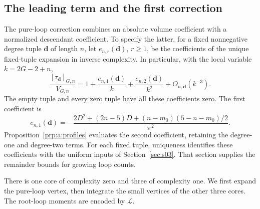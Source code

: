 \subsection{The leading term and the first correction}
\label{subsec:s04:02}

The pure-loop correction combines an absolute volume coefficient with
a normalized descendant coefficient. To specify the latter, for a
fixed nonnegative degree tuple $\mathbf d$ of length $n$, let
$e_{n,r}(\mathbf d)$, $r\geq1$, be the coefficients of the unique
fixed-tuple expansion in inverse complexity. In particular, with the
local variable $k=2G-2+n$,
\begin{equation}\label{eq:s04:profile-coefficients}
 \frac{[\tau_{\mathbf d}]_{G,n}}{V_{G,n}}
 =1+\frac{e_{n,1}(\mathbf d)}k
     +\frac{e_{n,2}(\mathbf d)}{k^2}+O_{n,\mathbf d}(k^{-3}).
\end{equation}
The empty tuple and every zero tuple have all these coefficients zero.
The first coefficient is
\begin{equation}\label{eq:s04:first-profile}
 e_{n,1}(\mathbf d)
 =-\frac{2D^2+(2n-5)D+(n-m_0)(5-n-m_0)/2}{\pi^2}.
\end{equation}
Proposition~\ref{prp:a:profiles} evaluates the second coefficient,
retaining the degree-one and degree-two terms. For each fixed tuple,
uniqueness identifies these coefficients with the uniform inputs of
Section~\ref{sec:s03}. That section supplies the remainder bounds
for growing loop counts.

There is one core of complexity zero and three of complexity one.
We first expand the pure-loop vertex, then integrate the small vertices
of the other three cores. The root-loop moments are encoded by
$\mathcal L$.

